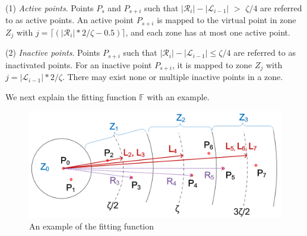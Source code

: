 \stab (1) {\em Active points}. Points $P_{s}$ and $P_{s+i}$ such that $|\mathcal{R}_{i}| - |\mathcal{L}_{i-1}|$ $>$ $\zeta/4$ are referred to as active points. An active point $P_{s+i}$ is mapped to the virtual point in zone $Z_j$ with $j= \lceil(|\mathcal{R}_{i}|*2/\zeta - 0.5)\rceil$, and each zone has at most one active point.

\stab(2) {\em Inactive points}. Points $P_{s+i}$ such that $|\mathcal{R}_{i}| - |\mathcal{L}_{i-1}| \le \zeta/4$ are referred to as inactivated points. For an inactive point $P_{s+i}$, it is mapped to zone $Z_j$ with $j = |\mathcal{L}_{i-1}|*2/\zeta$. There may exist none or multiple inactive points in a zone.



We next explain the fitting function $\mathbb{F}$ with an example.

\begin{figure}[tb!]
\centering
\includegraphics[scale = 0.62]{figures/Fig-FitFunction.png}
\vspace{-2ex}
\caption{\small An example of the fitting function}
\label{fig:fitfunction}
\vspace{-4ex}
\end{figure}

